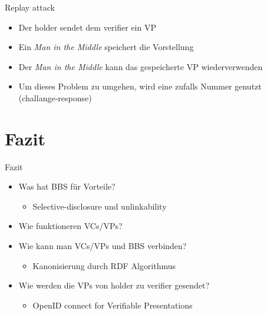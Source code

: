 \documentclass[
	german,%
	authorontitle=true,
	]{bfhbeamer}
\begin{document}
\begin{frame}{Replay attack}
    \begin{itemize}
        \item Der holder sendet dem verifier ein VP
        \item Ein \textit{Man in the Middle} speichert die Vorstellung
        \item Der \textit{Man in the Middle} kann das gespeicherte VP wiederverwenden
        \item Um dieses Problem zu umgehen, wird eine zufalls Nummer genutzt (challange-response)
    \end{itemize}
\end{frame}


\section{Fazit}

\begin{frame}{Fazit}
    \begin{itemize}
        \item Was hat BBS für Vorteile?
        \begin{itemize}
            \item Selective-disclosure und unlinkability
        \end{itemize}
        \item Wie funktioneren VCs/VPs?
        \item Wie kann man VCs/VPs und BBS verbinden?
        \begin{itemize}
            \item Kanonisierung durch RDF Algorithmus
        \end{itemize}
        \item Wie werden die VPs von holder zu verifier gesendet?
        \begin{itemize}
            \item OpenID connect for Verifiable Presentations
        \end{itemize}
    \end{itemize}
\end{frame}
\end{document}
